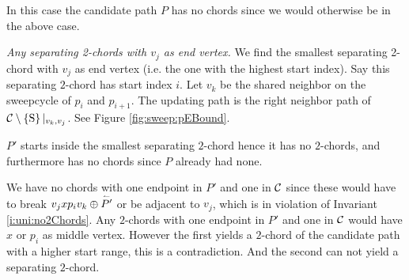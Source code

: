     In this case the candidate path $P$ has no chords since we would otherwise be in the above case.

    \emph{Any separating 2-chords with $v_j$ as end vertex.}
      We find the smallest separating 2-chord with $v_j$ as end vertex (i.e. the one with the highest start index). Say this separating $2$-chord has start index $i$.
      Let $v_k$ be the shared neighbor on the sweepcycle of $p_{i}$ and $p_{i +1}$. The updating path is the right neighbor path of $\mathcal{C} \setminus \left\lbrace {\mathrm{S}} \right\rbrace|_{v_k, v_j}$. See Figure \ref{fig:sweep:pEBound}.

      $P'$ starts inside the smallest separating $2$-chord hence it has no $2$-chords, and furthermore has no chords since $P$ already had none.

      We have no chords with one endpoint in $P'$ and one in $\mathcal{C}$  since these would have to break $v_j x p_i v_k \oplus \accentset{\leftharpoonup}{P'}$ or be adjacent to $v_j$, which is in violation of Invariant \ref{i:uni:no2Chords}. Any $2$-chords with one endpoint in $P'$ and one in $\mathcal{C}$ would have $x$ or $p_i$ as middle vertex. However the first yields a $2$-chord of the candidate path with a higher start range, this is a contradiction. And the second can not yield a separating $2$-chord. %

